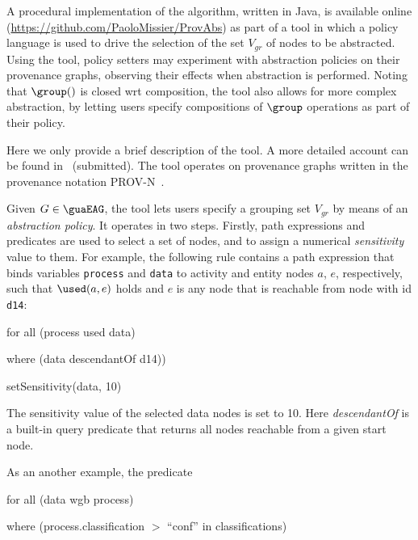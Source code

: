 A procedural implementation of the algorithm, written in Java, is available online (\url{https://github.com/PaoloMissier/ProvAbs}) as part of a tool in which a policy language is used to drive the selection of the set $V_{gr}$ of nodes to be abstracted. Using the tool, policy setters may experiment with abstraction policies on their provenance graphs, observing their effects when abstraction is performed.
%
Noting that $\group()$ is closed wrt composition, the tool also allows for more complex abstraction, by letting users specify compositions of $\group$ operations as part of their policy.

%
Here we only provide a brief description of the tool. A more detailed account can be found in~\citep{Missier2013c} (submitted).
%
The tool operates on provenance graphs written in the provenance notation PROV-N~\citep{w3c-prov-n}.

%
Given $G \in \guaEAG$, the tool lets users specify a grouping set $V_{gr}$ by means of an \textit{abstraction policy}. It operates in two steps. Firstly, path expressions and predicates are used to select a set of nodes, and to assign a numerical \textit{sensitivity} value to them. 
%
For example, the following rule contains a path expression that binds variables \texttt{process} and \texttt{data} to activity and entity nodes $a$, $e$, respectively, such that $\used(a,e)$ holds and $e$ is any node that is reachable from node with id \texttt{d14}:

\vspace{0.5\baselineskip}

\small
\textsf{for all (process used data)}

\textsf{ \;\;\; where (data descendantOf d14)) }

\textsf{ \;\;\;\;\;\; setSensitivity(data, 10)}

\vspace{0.5\baselineskip}

\normalsize

The sensitivity value of the selected data nodes is set to 10.
%
Here \textit{descendantOf} is a built-in query predicate that returns all nodes reachable from a given start node. 

%
As an another example, the  predicate

\vspace{0.5\baselineskip}

\small
\textsf{for all (data wgb process)} 

 \textsf{ \;\;\; where (process.classification $>$ ``conf'' in classifications) }

